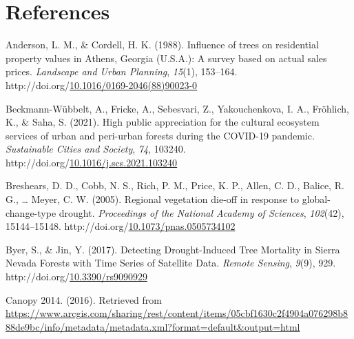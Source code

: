 \documentclass[12pt,twoside]{reedthesis}
\newlength{\cslhangindent}
\newenvironment{CSLReferences}[2] %
 {%
  \setlength{\parindent}{0pt}
  \ifodd #1 \everypar{\setlength{\hangindent}{\cslhangindent}}\ignorespaces\fi
  \ifnum #2 > 0
  \setlength{\parskip}{#2\baselineskip}
  \fi
 }%
 {}
\begin{document}
\backmatter

\hypertarget{references}{%
\chapter*{References}\label{references}}


\noindent

\setlength{\parindent}{-0.20in}

\hypertarget{refs}{}
\begin{CSLReferences}{1}{0}
\leavevmode{}%
Anderson, L. M., \& Cordell, H. K. (1988). Influence of trees on residential property values in Athens, Georgia (U.S.A.): A survey based on actual sales prices. \emph{Landscape and Urban Planning}, \emph{15}(1), 153--164. http://doi.org/\href{https://doi.org/10.1016/0169-2046(88)90023-0}{10.1016/0169-2046(88)90023-0}

\leavevmode{}%
Beckmann-Wübbelt, A., Fricke, A., Sebesvari, Z., Yakouchenkova, I. A., Fröhlich, K., \& Saha, S. (2021). High public appreciation for the cultural ecosystem services of urban and peri{\nobreakdash-}urban forests during the COVID-19 pandemic. \emph{Sustainable Cities and Society}, \emph{74}, 103240. http://doi.org/\href{https://doi.org/10.1016/j.scs.2021.103240}{10.1016/j.scs.2021.103240}

\leavevmode{}%
Breshears, D. D., Cobb, N. S., Rich, P. M., Price, K. P., Allen, C. D., Balice, R. G., \ldots{} Meyer, C. W. (2005). Regional vegetation die-off in response to global-change-type drought. \emph{Proceedings of the National Academy of Sciences}, \emph{102}(42), 15144--15148. http://doi.org/\href{https://doi.org/10.1073/pnas.0505734102}{10.1073/pnas.0505734102}

\leavevmode{}%
Byer, S., \& Jin, Y. (2017). Detecting Drought-Induced Tree Mortality in Sierra Nevada Forests with Time Series of Satellite Data. \emph{Remote Sensing}, \emph{9}(9), 929. http://doi.org/\href{https://doi.org/10.3390/rs9090929}{10.3390/rs9090929}

\leavevmode{}%
Canopy 2014. (2016). Retrieved from \url{https://www.arcgis.com/sharing/rest/content/items/05cbf1630c2f4904a076298b888de9bc/info/metadata/metadata.xml?format=default\&output=html}


\end{CSLReferences}
\end{document}
